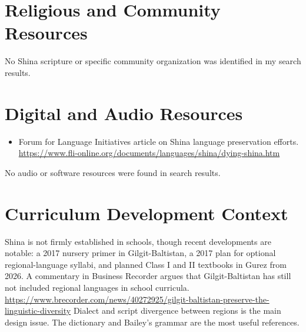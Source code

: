 \documentclass[12pt]{article}
\begin{document}
\section{Religious and Community Resources}
No Shina scripture or specific community organization was identified in my search results.

\section{Digital and Audio Resources}
\begin{itemize}
\item Forum for Language Initiatives article on Shina language preservation efforts. \url{https://www.fli-online.org/documents/languages/shina/dying-shina.htm}
\end{itemize}
No audio or software resources were found in search results.

\section{Curriculum Development Context}
Shina is not firmly established in schools, though recent developments are notable: a 2017 nursery primer in Gilgit-Baltistan, a 2017 plan for optional regional-language syllabi, and planned Class I and II textbooks in Gurez from 2026. A commentary in Business Recorder argues that Gilgit-Baltistan has still not included regional languages in school curricula. \url{https://www.brecorder.com/news/40272925/gilgit-baltistan-preserve-the-linguistic-diversity} Dialect and script divergence between regions is the main design issue. The dictionary and Bailey's grammar are the most useful references.
\end{document}
